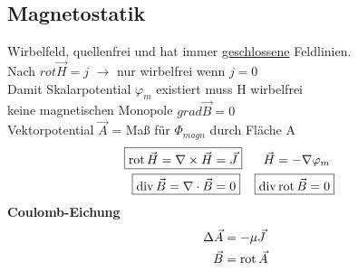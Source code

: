 


\subsection{Magnetostatik}
\textbullet Wirbelfeld, quellenfrei und hat immer \underline{geschlossene} Feldlinien.\\
\textbullet Nach $rot \vec{H} = j$ $\rightarrow$ nur wirbelfrei wenn $j = 0$\\
\textbullet Damit Skalarpotential $ \varphi_m$ existiert muss H wirbelfrei\\
\textbullet keine magnetischen Monopole $grad \vec{B} = 0$\\
\textbullet Vektorpotential $ \vec{A}$ = Maß für $\Phi_{magn} $ durch Fläche A
\begin{align*}
    \Aboxed{\oprot \vec{H} = \nabla \times \vec{H} & = \vec{J} } & \vec{H} = - \nabla \varphi_m \\
    \Aboxed{\opdiv \vec{B} = \nabla \cdot \vec{B}  & = 0 } & \Aboxed{\opdiv \oprot \vec{B} = 0}
\end{align*}
\textbf{Coulomb-Eichung}
\begin{align*}
    \Delta \vec{A} & = - \mu \vec{J}  \\
    \vec{B}        & = \operatorname{rot} \vec{A}
\end{align*}

